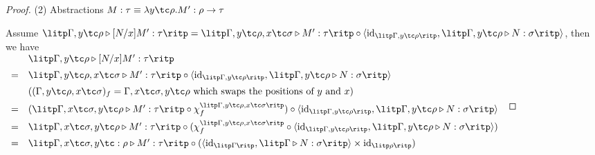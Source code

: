 \begin{proof}
(2) Abstractions $ M: \tau \equiv \lambda y \tc \rho . M' : \rho \to \tau $

Assume $ \litp \Gamma , y \tc \rho \triangleright [N/x]M': \tau \ritp = \litp \Gamma , y \tc \rho , x \tc \sigma \triangleright M': \tau \ritp \circ \langle \text{id}_{\litp \Gamma , y \tc \rho \ritp} , \litp \Gamma , y \tc \rho \triangleright N: \sigma \ritp \rangle $, then we have \\[5pt]
$
\begin{array}{rl}
   & \litp \Gamma , y \tc \rho \triangleright [N/x]M': \tau \ritp \\[5pt]
 = & \litp \Gamma , y \tc \rho , x \tc \sigma \triangleright M': \tau \ritp \circ \langle \text{id}_{\litp \Gamma , y \tc \rho \ritp} , \litp \Gamma , y \tc \rho \triangleright N: \sigma \ritp \rangle \\[5pt]
   & ((\Gamma , y \tc \rho , x \tc \sigma )_f = \Gamma , x \tc \sigma , y \tc \rho \text{ which swaps the positions of } y \text{ and } x) \\[5pt]
 = & (\litp \Gamma , x \tc \sigma , y \tc \rho \triangleright M': \tau \ritp \circ \chi_f^{\litp \Gamma , y \tc \rho , x \tc \sigma \ritp}) \circ \langle \text{id}_{\litp \Gamma , y \tc \rho \ritp} , \litp \Gamma , y \tc \rho \triangleright N: \sigma \ritp \rangle \\[5pt]
 = & \litp \Gamma , x \tc \sigma , y \tc \rho \triangleright M': \tau \ritp \circ ( \chi_f^{\litp \Gamma , y \tc \rho , x \tc \sigma \ritp} \circ \langle \text{id}_{\litp \Gamma , y \tc \rho \ritp} , \litp \Gamma , y \tc \rho \triangleright N: \sigma \ritp \rangle ) \\[5pt]
 = & \litp \Gamma , x \tc \sigma , y \tc: \rho \triangleright M': \tau \ritp \circ ( \langle \text{id}_{\litp \Gamma \ritp} , \litp \Gamma \triangleright N: \sigma \ritp \rangle \times \text{id}_{\litp \rho \ritp} ) \\[10pt]
\end{array}
$


\end{proof}
